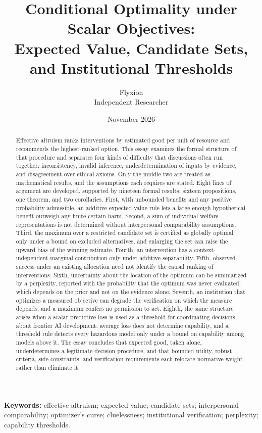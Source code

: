 \documentclass[11pt]{article}
\title{Conditional Optimality under Scalar Objectives:\\
Expected Value, Candidate Sets, and Institutional Thresholds}
\author{Flyxion\\Independent Researcher}
\date{November 2026}
\theoremstyle{definition}
\theoremstyle{remark}
\begin{document}
\begin{titlepage}
\maketitle
\thispagestyle{empty}
\vspace{0.5em}
\begin{abstract}
\small\noindent
Effective altruism ranks interventions by estimated good per unit of resource and recommends the highest-ranked option. This essay examines the formal structure of that procedure and separates four kinds of difficulty that discussions often run together: inconsistency, invalid inference, underdetermination of inputs by evidence, and disagreement over ethical axioms. Only the middle two are treated as mathematical results, and the assumptions each requires are stated. Eight lines of argument are developed, supported by nineteen formal results: sixteen propositions, one theorem, and two corollaries. First, with unbounded benefits and any positive probability admissible, an additive expected-value rule lets a large enough hypothetical benefit outweigh any finite certain harm. Second, a sum of individual welfare representations is not determined without interpersonal comparability assumptions. Third, the maximum over a restricted candidate set is certified as globally optimal only under a bound on excluded alternatives, and enlarging the set can raise the upward bias of the winning estimate. Fourth, an intervention has a context-independent marginal contribution only under additive separability. Fifth, observed success under an existing allocation need not identify the causal ranking of interventions. Sixth, uncertainty about the location of the optimum can be summarized by a perplexity, reported with the probability that the optimum was never evaluated, which depends on the prior and not on the evidence alone. Seventh, an institution that optimizes a measured objective can degrade the verification on which the measure depends, and a maximum confers no permission to act. Eighth, the same structure arises when a scalar predictive loss is used as a threshold for coordinating decisions about frontier AI development: average loss does not determine capability, and a threshold rule detects every hazardous model only under a bound on capability among models above it. The essay concludes that expected good, taken alone, underdetermines a legitimate decision procedure, and that bounded utility, robust criteria, side constraints, and verification requirements each relocate normative weight rather than eliminate it.
\end{abstract}
\vspace{1.2em}
\noindent\textbf{Keywords:} effective altruism; expected value; candidate sets; interpersonal comparability; optimizer's curse; cluelessness; institutional verification; perplexity; capability thresholds.
\end{titlepage}
\end{document}
